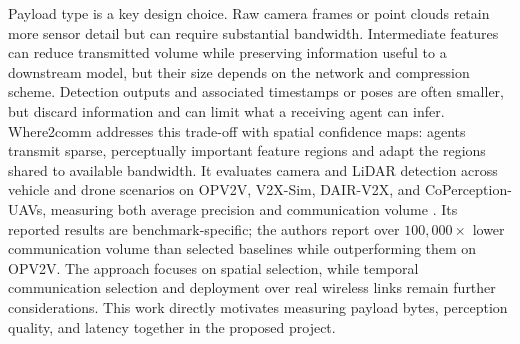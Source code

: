 \documentclass[12pt,a4paper,oneside]{report}
\begin{document}
Payload type is a key design choice. Raw camera frames or point clouds retain
more sensor detail but can require substantial bandwidth. Intermediate
features can reduce transmitted volume while preserving information useful
to a downstream model, but their size depends on the network and compression
scheme. Detection outputs and associated timestamps or poses are often
smaller, but discard information and can limit what a receiving agent can
infer. Where2comm addresses this trade-off with spatial confidence maps:
agents transmit sparse, perceptually important feature regions and adapt
the regions shared to available bandwidth. It evaluates camera and LiDAR
detection across vehicle and drone scenarios on OPV2V, V2X-Sim, DAIR-V2X,
and CoPerception-UAVs, measuring both average precision and communication
volume \cite{where2comm2022}. Its reported results are benchmark-specific;
the authors report over $100{,}000\times$ lower communication volume than
selected baselines while outperforming them on OPV2V. The approach focuses
on spatial selection, while temporal communication selection and deployment
over real wireless links remain further considerations. This work directly
motivates measuring payload bytes, perception quality, and latency together
in the proposed project.
\end{document}

